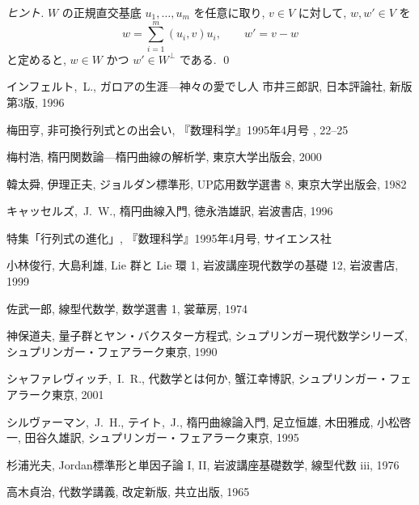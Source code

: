 \documentclass[12pt,twoside]{jarticle}
\begin{document}
\begin{proof}[ヒント]
  $W$ の正規直交基底 $u_1,\ldots,u_m$ を任意に取り, $v\in V$ に対して,
  $w,w'\in V$ を
  \begin{equation*}
    w = \sum_{i=1}^m (u_i,v)u_i, \qquad w' = v - w
  \end{equation*}
  と定めると, $w\in W$ かつ $w'\in W^\bot$ である. 
  \qed
\end{proof}


\begin{thebibliography}{ABCD}

インフェルト,~L.,
ガロアの生涯—神々の愛でし人
市井三郎訳, 
日本評論社, 新版第3版, 1996

梅田亨, 非可換行列式との出会い, 『数理科学』1995年4月号 \cite{det-evo}, 22--25

梅村浩, 楕円関数論---楕円曲線の解析学, 東京大学出版会, 2000

韓太舜, 伊理正夫, ジョルダン標準形, UP応用数学選書 8, 東京大学出版会, 1982

キャッセルズ,~J.~W., 楕円曲線入門, 徳永浩雄訳, 岩波書店, 1996

特集「行列式の進化」, 『数理科学』1995年4月号, サイエンス社

小林俊行, 大島利雄, Lie 群と Lie 環 1, 岩波講座現代数学の基礎 12,
岩波書店, 1999

佐武一郎, 線型代数学, 数学選書 1, 裳華房, 1974

神保道夫, 量子群とヤン・バクスター方程式,
シュプリンガー現代数学シリーズ,
シュプリンガー・フェアラーク東京, 1990

シャファレヴィッチ,~I.~R., 代数学とは何か, 蟹江幸博訳, シュプリンガー・フェ
アラーク東京, 2001

シルヴァーマン,~J.~H., テイト,~J., 楕円曲線論入門, 
足立恒雄, 木田雅成, 小松啓一, 田谷久雄訳, 
シュプリンガー・フェアラーク東京, 1995

杉浦光夫, Jordan標準形と単因子論 I, II, 岩波講座基礎数学, 線型代数 iii, 1976

高木貞治, 代数学講義, 改定新版, 共立出版, 1965


\end{thebibliography}
\end{document}
